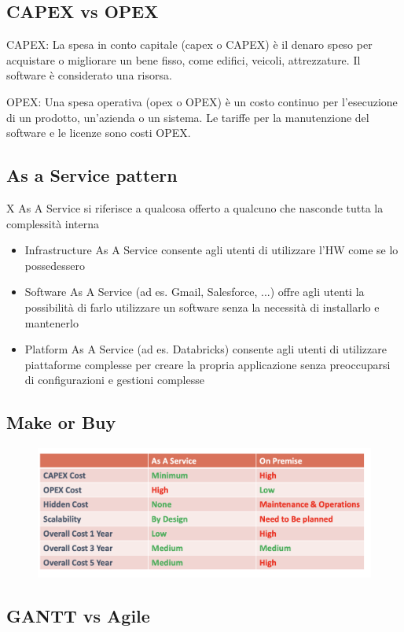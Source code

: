 \documentclass{article}
\begin{document}
\subsection{CAPEX vs OPEX}
CAPEX: La spesa in conto capitale (capex o CAPEX) è il denaro speso per acquistare o migliorare un bene fisso, come edifici, veicoli, attrezzature. Il software è considerato una risorsa.

OPEX: Una spesa operativa (opex o OPEX) è un costo continuo per l'esecuzione di un prodotto, un'azienda o un sistema. Le tariffe per la manutenzione del software e le licenze sono costi OPEX.
\subsection{As a Service pattern}
X As A Service si riferisce a qualcosa offerto a qualcuno che nasconde tutta la complessità interna
\begin{itemize}
    \item Infrastructure As A Service consente agli utenti di utilizzare l'HW come se lo possedessero
    \item Software As A Service (ad es. Gmail, Salesforce, ...) offre agli utenti la possibilità di farlo
utilizzare un software senza la necessità di installarlo e mantenerlo
    \item Platform As A Service (ad es. Databricks) consente agli utenti di utilizzare piattaforme complesse per creare la propria applicazione senza preoccuparsi di configurazioni e gestioni complesse
\end{itemize}
\subsection{Make or Buy}

\begin{figure}[htp]
    \centering
    \includegraphics[width=\linewidth]{fig/make_or_buy.png}
    \label{fig:Make Or Buy}
\end{figure}

\subsection{GANTT vs Agile}
\end{document}
